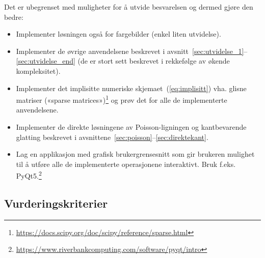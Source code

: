 \documentclass[11pt,a4paper]{article}
\begin{document}
Det er ubegrenset med muligheter for å utvide besvarelsen og dermed gjøre den bedre:
\begin{itemize}[noitemsep]
\item Implementer løsningen også for fargebilder (enkel liten   utvidelse).
\item Implementer de øvrige anvendelsene beskrevet i avsnitt~\ref{sec:utvidelse_1}--\ref{sec:utvidelse_end} (de er   stort sett beskrevet i rekkefølge av økende kompleksitet).
\item Implementer det implisitte numeriske skjemaet~(\ref{eq:implisitt}) vha. glisne matriser («sparse   matrices»)\footnote{\url{https://docs.scipy.org/doc/scipy/reference/sparse.html}} og prøv det for alle de implementerte anvendelsene.
\item Implementer de direkte løsningene av Poisson-ligningen og kantbevarende glatting beskrevet i avsnittene~\ref{sec:poisson}--\ref{sec:direktekant}.
\item Lag en applikasjon med grafisk brukergrensesnitt som gir   brukeren mulighet til å utføre alle de implementerte operasjonene   interaktivt. Bruk f.eks.   PyQt5.\footnote{\url{https://www.riverbankcomputing.com/software/pyqt/intro}}
\end{itemize}

\subsection{Vurderingskriterier}
\end{document}
